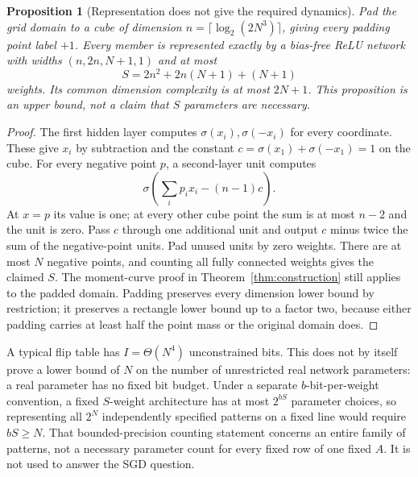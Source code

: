 \documentclass[11pt]{article}
\newtheorem{proposition}[theorem]{Proposition}
\newcommand{\1}{\mathbf 1}
\begin{document}
\begin{samepage}
\begin{proposition}[Representation does not give the required dynamics]\label{thm:network}
Pad the grid domain to a cube of dimension $n=\lceil\log_2(2N^3)\rceil$, giving every padding point label $+1$. Every member is represented exactly by a bias-free ReLU network with widths $(n,2n,N+1,1)$ and at most
\[
 S=2n^2+2n(N+1)+(N+1)
\]
weights. Its common dimension complexity is at most $2N+1$. This proposition is an upper bound, not a claim that $S$ parameters are necessary.
\end{proposition}
\end{samepage}
\begin{proof}
The first hidden layer computes $\sigma(x_i),\sigma(-x_i)$ for every coordinate. These give $x_i$ by subtraction and the constant $c=\sigma(x_1)+\sigma(-x_1)=1$ on the cube. For every negative point $p$, a second-layer unit computes
\[
 \sigma\left(\sum_i p_ix_i-(n-1)c\right).
\]
At $x=p$ its value is one; at every other cube point the sum is at most $n-2$ and the unit is zero. Pass $c$ through one additional unit and output $c$ minus twice the sum of the negative-point units. Pad unused units by zero weights. There are at most $N$ negative points, and counting all fully connected weights gives the claimed $S$. The moment-curve proof in Theorem~\ref{thm:construction} still applies to the padded domain. Padding preserves every dimension lower bound by restriction; it preserves a rectangle lower bound up to a factor two, because either padding carries at least half the point mass or the original domain does.
\end{proof}

A typical flip table has $I=\Theta(N^4)$ unconstrained bits. This does not by itself prove a lower bound of $N$ on the number of unrestricted real network parameters: a real parameter has no fixed bit budget. Under a separate $b$-bit-per-weight convention, a fixed $S$-weight architecture has at most $2^{bS}$ parameter choices, so representing all $2^N$ independently specified patterns on a fixed line would require $bS\ge N$. That bounded-precision counting statement concerns an entire family of patterns, not a necessary parameter count for every fixed row of one fixed $A$. It is not used to answer the SGD question.
\end{document}
